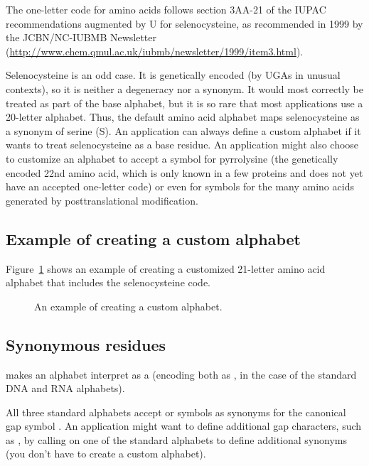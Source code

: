 The one-letter code for amino acids follows section 3AA-21 of the
IUPAC recommendations \citep{IUPAC84} augmented by U for
selenocysteine, as recommended in 1999 by the JCBN/NC-IUBMB Newsletter
(\url{http://www.chem.qmul.ac.uk/iubmb/newsletter/1999/item3.html}).

Selenocysteine is an odd case. It is genetically encoded (by UGAs in
unusual contexts), so it is neither a degeneracy nor a synonym. It
would most correctly be treated as part of the base alphabet, but it
is so rare that most applications use a 20-letter alphabet.  Thus, the
default amino acid alphabet maps selenocysteine as a synonym of serine
(S). An application can always define a custom alphabet if it wants to
treat selenocysteine as a base residue. An application might also
choose to customize an alphabet to accept a symbol for pyrrolysine
(the genetically encoded 22nd amino acid, which is only known in a few
proteins and does not yet have an accepted one-letter code) or even
for symbols for the many amino acids generated by posttranslational
modification.


\subsection{Example of creating a custom alphabet}

Figure~\ref{fig:alphabet_example2} shows an example of creating a
customized 21-letter amino acid alphabet that includes the 
selenocysteine code.

\begin{figure}

\caption{An example of creating a custom alphabet.}
\label{fig:alphabet_example2}
\end{figure}

\subsection{Synonymous residues}

 makes an alphabet
interpret  as a  (encoding both as , in the
case of the standard DNA and RNA alphabets).
 
All three standard alphabets accept \ccode{\_} or   symbols
as synonyms for the canonical gap symbol \ccode{-}. An application
might want to define additional gap characters, such as \ccode{~}, by
calling  on one of the
standard alphabets to define additional synonyms (you don't have to
create a custom alphabet).

